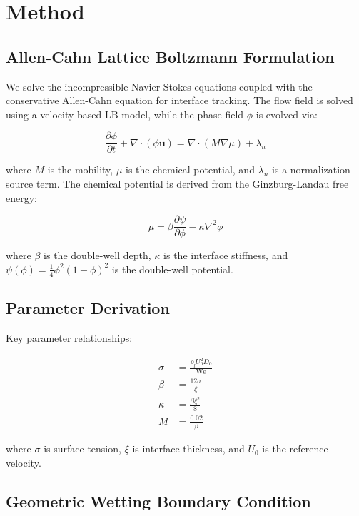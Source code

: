 \section{Method}\label{sec:method}

\subsection{Allen-Cahn Lattice Boltzmann Formulation}

We solve the incompressible Navier-Stokes equations coupled with the conservative Allen-Cahn equation for interface tracking. The flow field is solved using a velocity-based LB model, while the phase field $\phi$ is evolved via:

\begin{equation}
\frac{\partial \phi}{\partial t} + \nabla \cdot (\phi \mathbf{u}) = \nabla \cdot (M \nabla \mu) + \lambda_n
\end{equation}

where $M$ is the mobility, $\mu$ is the chemical potential, and $\lambda_n$ is a normalization source term. The chemical potential is derived from the Ginzburg-Landau free energy:

\begin{equation}
\mu = \beta \frac{\partial \psi}{\partial \phi} - \kappa \nabla^2 \phi
\end{equation}

where $\beta$ is the double-well depth, $\kappa$ is the interface stiffness, and $\psi(\phi) = \frac{1}{4}\phi^2(1-\phi)^2$ is the double-well potential.

\subsection{Parameter Derivation}

Key parameter relationships:

\begin{align}
\sigma &= \frac{\rho_l U_0^2 D_0}{\text{We}} \\
\beta &= \frac{12\sigma}{\xi} \\
\kappa &= \frac{\beta \xi^2}{8} \\
M &= \frac{0.02}{\beta}
\end{align}

where $\sigma$ is surface tension, $\xi$ is interface thickness, and $U_0$ is the reference velocity.

\subsection{Geometric Wetting Boundary Condition}

